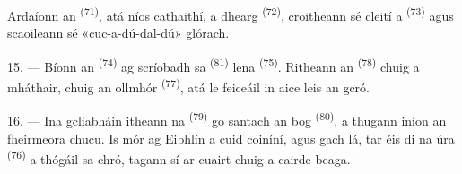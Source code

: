 Ardaíonn an  \textsuperscript{(71)}, atá níos cathaithí, a
 dhearg \textsuperscript{(72)}, croitheann sé cleití a
 \textsuperscript{(73)} agus scaoileann sé «cuc-a-dú-dal-dú»
glórach.

15. --- Bíonn an  \textsuperscript{(74)} ag scríobadh sa
 \textsuperscript{(81)} lena 
\textsuperscript{(75)}. Ritheann an  \textsuperscript{(78)} chuig a
mháthair, chuig an  ollmhór \textsuperscript{(77)}, atá le feiceáil
in aice leis an gcró.

16. --- Ina gcliabháin itheann na  \textsuperscript{(79)} go santach
an  bog \textsuperscript{(80)}, a thugann iníon an fheirmeora chucu. Is
mór ag Eibhlín a cuid coiníní, agus gach lá, tar éis di na 
úra \textsuperscript{(76)} a thógáil sa chró, tagann sí ar cuairt chuig a cairde
beaga.
\VUsaut{6.0mm}
\VUfilet{22mm}
